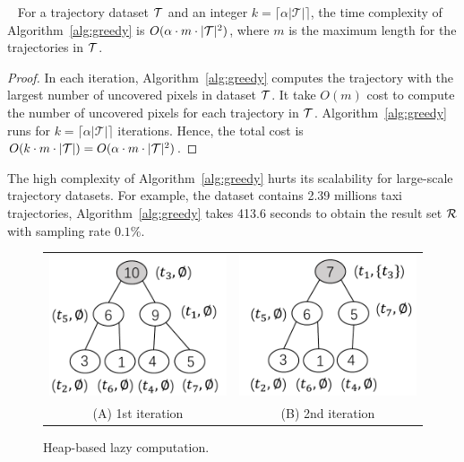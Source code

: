\begin{lemma}~\label{lem:cost}
For a trajectory dataset $\mathcal{T}$ and an integer $k=\lceil \alpha |\mathcal{T}| \rceil$, the time complexity of Algorithm~\ref{alg:greedy} is $O(\alpha \cdot m \cdot |\mathcal{T}|^2)$,
where $m$ is the maximum length for the trajectories in $\mathcal{T}$.
\end{lemma}


\begin{proof}
In each iteration, Algorithm~\ref{alg:greedy} computes the trajectory with the largest number of uncovered pixels in dataset $\mathcal{T}$.
It take $O(m)$ cost to compute the number of uncovered pixels for each trajectory in $\mathcal{T}$.
Algorithm~\ref{alg:greedy} runs for $k=\lceil \alpha |\mathcal{T}| \rceil$ iterations.
Hence, the total cost is $O(k \cdot m \cdot |\mathcal{T}|)=O(\alpha \cdot m \cdot |\mathcal{T}|^2)$.
\end{proof}
The high complexity of Algorithm~\ref{alg:greedy} hurts its scalability for large-scale trajectory datasets.
For example, the \pt{} dataset contains 2.39 millions taxi trajectories, Algorithm~\ref{alg:greedy} takes 413.6 seconds to obtain the result set $\mathcal{R}$ with sampling rate $0.1\%$.


\begin{figure}
	\centering
	\small
	\begin{tabular}{cc}
		\includegraphics[width=0.42\columnwidth]{pictures/1st}
		&
		\includegraphics[width=0.42\columnwidth]{pictures/2nd}
		\\
		(A) 1st iteration
		&
		(B) 2nd iteration
	\end{tabular}
    \trim
    \vspace{-2mm}
	\caption{Heap-based lazy computation.} \label{fig:heap} %
    \trim \trim
\end{figure}


